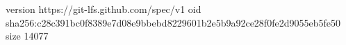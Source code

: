 version https://git-lfs.github.com/spec/v1
oid sha256:c28c391bc0f8389e7d08e9bbebd8229601b2e5b9a92ce28f0fe2d9055eb5fe50
size 14077
